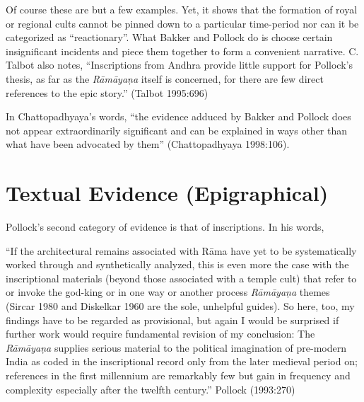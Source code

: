 Of course these are but a few examples. Yet, it shows that the formation of royal or regional cults cannot be pinned down to a particular time-period nor can it be categorized as “reactionary”.  What Bakker and Pollock do is choose certain insignificant incidents and piece them together to form a convenient narrative. C. Talbot also notes, “Inscriptions from Andhra provide little support for Pollock’s thesis, as far as the {\sl Rāmāyaṇa} itself is concerned, for there are few direct references to the epic story.” (Talbot 1995:696) 

In Chattopadhyaya’s words, “the evidence adduced by Bakker and Pollock does not appear extraordinarily significant and can be explained in ways other than what have been advocated by them” (Chattopadhyaya 1998:106).

\section{Textual Evidence (Epigraphical)}\label{sec3.2}

Pollock’s second category of evidence is that of inscriptions. In his words, 

\begin{myquote}
“If the architectural remains associated with Rāma have yet to be systematically worked through and synthetically analyzed, this is even more the case with the inscriptional materials (beyond those associated with a temple cult) that refer to or invoke the god-king or in one way or another process {\sl Rāmāyaṇa} themes (Sircar 1980 and Diskelkar 1960 are the sole, unhelpful guides). So here, too, my findings have to be regarded as provisional, but again I would be surprised if further work would require fundamental revision of my conclusion: The {\sl Rāmāyaṇa} supplies serious material to the political imagination of pre-modern India as coded in the inscriptional record only from the later medieval period on; references in the first millennium are remarkably few but gain in frequency and complexity especially after the twelfth century.”
\hfill Pollock (1993:270)
\end{myquote}

